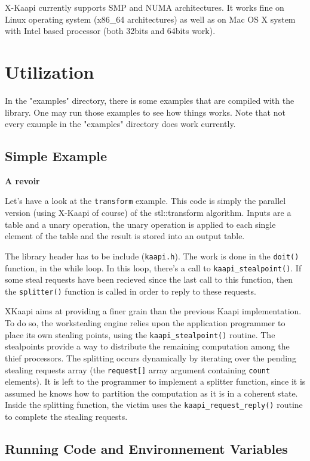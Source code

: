 \documentclass{article}
\newcommand{\kaapi}{\textsc{X}-Kaapi\xspace}
\begin{document}
\kaapi currently supports SMP and NUMA architectures. 
It works fine on Linux operating system (x86\_64 architectures) as well as on Mac OS X system with Intel based processor (both 32bits and 64bits work).

\section{Utilization}

In the "examples" directory, there is some examples that are compiled with the library. One may run those examples to see how things works.
Note that not every example in the "examples" directory does work currently.

\subsection{Simple Example}
\textbf{A revoir}
\begin{it}
Let's have a look at the \verb+transform+ example. This code is simply the parallel version (using \kaapi  of course) of the stl::transform
algorithm. Inputs are a table and a unary operation, the unary operation is applied to each single element of the table and the result is stored into an output table.

The library header has to be include (\verb+kaapi.h+). The work is done in the \verb+doit()+ function, in the while loop. In this loop, there's a call to \verb+kaapi_stealpoint()+. If some steal requests have been recieved since the last call to this function, then the \verb+splitter()+ function is called in order to reply to these requests.

XKaapi aims at providing a finer grain than the previous Kaapi implementation. To do so, the workstealing engine relies upon the application programmer to place its own stealing points, using the \verb+kaapi_stealpoint()+ routine. The stealpoints provide a way to distribute the remaining computation among the thief processors. The splitting occurs dynamically by iterating over the pending stealing requests array (the \verb+request[]+ array argument containing \verb+count+ elements). It is left to the programmer to implement a splitter function, since it is assumed he knows how to partition the computation as it is in a coherent state. Inside the splitting function, the victim uses the \verb+kaapi_request_reply()+ routine to complete the stealing requests.
\end{it}


\subsection{Running Code and Environnement Variables}
\end{document}

